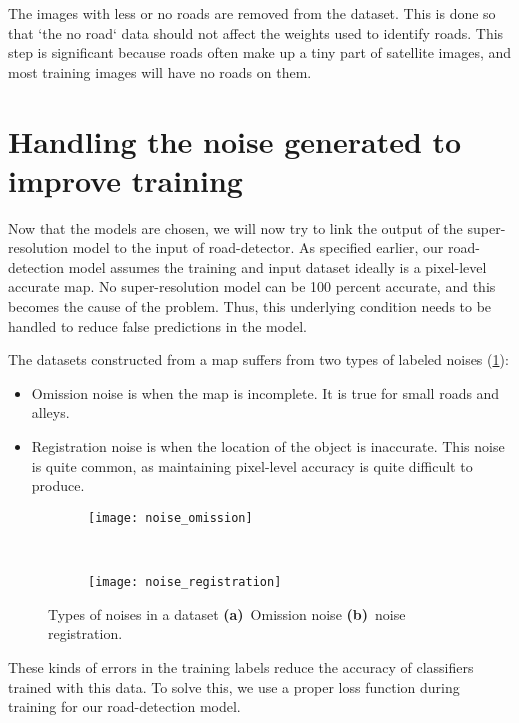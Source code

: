 The images with less or no roads are removed from the dataset. This is done so that `the no road` data should not affect the weights used to identify roads. This step is significant because roads often make up a tiny part of satellite images, and most training images will have no roads on them.


\section{Handling the noise generated to improve training}
Now that the models are chosen, we will now try to link the output of the super-resolution model to the input of road-detector. As specified earlier, our road-detection model assumes the training and input dataset ideally is a pixel-level accurate map. No super-resolution model can be 100 percent accurate, and this becomes the cause of the problem. Thus, this underlying condition needs to be handled to reduce false predictions in the model.

The datasets constructed from a map suffers from two types of labeled noises (\cref{fig:noise_types}):
\begin{itemize}
  \setlength\itemsep{1pt}
  \item Omission noise is when the map is incomplete. It is true for small roads and alleys.
  \item Registration noise is when the location of the object is inaccurate. This noise is quite common, as maintaining pixel-level accuracy is quite difficult to produce.
\end{itemize}

\begin{figure}[h!]
  \centering
  \begin{subfigure}{0.63\textwidth}
    \texttt{[image: noise\_omission]}
    \caption{}
  \end{subfigure}~
  \begin{subfigure}{0.35\textwidth}
    \texttt{[image: noise\_registration]}
    \caption{}
  \end{subfigure}
  \caption[Types of noises in a dataset]{Types of noises in a dataset \textbf{(a)}~Omission noise \textbf{(b)}~noise registration.}
  \label{fig:noise_types}
\end{figure}

These kinds of errors in the training labels reduce the accuracy of classifiers trained with this data. To solve this, we use a proper loss function during training for our road-detection model.
